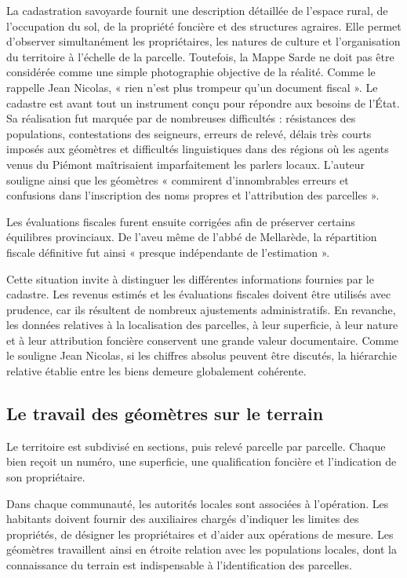 \documentclass[12pt,a4paper]{report}
\begin{document}
La cadastration savoyarde fournit une description détaillée de l'espace rural, de l'occupation du sol, de la propriété foncière et des structures agraires. Elle permet d'observer simultanément  les propriétaires, les natures de culture et l'organisation du territoire à l'échelle de la parcelle.
Toutefois, la Mappe Sarde ne doit pas être considérée comme une simple photographie objective de la réalité. Comme le rappelle Jean Nicolas, « rien n'est plus trompeur qu'un document fiscal ». Le cadastre est avant tout un instrument conçu pour répondre aux besoins de l'État. Sa réalisation fut marquée par de nombreuses difficultés : résistances des populations, contestations des seigneurs, erreurs de relevé, délais très courts imposés aux géomètres et difficultés linguistiques dans des régions où les agents venus du Piémont maîtrisaient imparfaitement les parlers locaux. L'auteur souligne ainsi que les géomètres « commirent d'innombrables erreurs et confusions dans l'inscription des noms propres et l'attribution des parcelles ».

Les évaluations fiscales furent ensuite corrigées afin de préserver certains équilibres provinciaux. De l'aveu même de l'abbé de Mellarède, la répartition fiscale définitive fut ainsi « presque indépendante de l'estimation ».

Cette situation invite à distinguer les différentes informations fournies par le cadastre. Les revenus estimés et les évaluations fiscales doivent être utilisés avec prudence, car ils résultent de nombreux ajustements administratifs. En revanche, les données relatives à la localisation des parcelles, à leur superficie, à leur nature et à leur attribution foncière conservent une grande valeur documentaire. Comme le souligne Jean Nicolas, si les chiffres absolus peuvent être discutés, la hiérarchie relative établie entre les biens demeure globalement cohérente.

\subsection{Le travail des géomètres sur le terrain}

 
Le territoire est subdivisé en sections, puis relevé parcelle par parcelle. Chaque bien reçoit un numéro, une superficie, une qualification foncière et l'indication de son propriétaire.

Dans chaque communauté, les autorités locales sont associées à l'opération. Les habitants doivent fournir des auxiliaires chargés d'indiquer les limites des propriétés, de désigner les propriétaires et d'aider aux opérations de mesure. Les géomètres travaillent ainsi en étroite relation avec les populations locales, dont la connaissance du terrain est indispensable à l'identification des parcelles.
\end{document}
